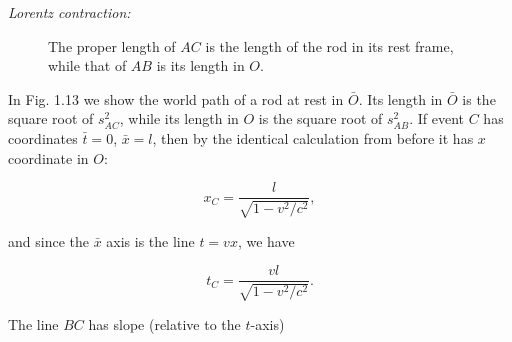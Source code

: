 \documentclass[12pt]{book}
\begin{document}
        \textit{Lorentz contraction:}
        \begin{figure}[h!]
        \centering
        \caption{The proper length of \( AC \) is the length of the rod in its rest frame, while that of \( AB \) is its length in \( O \).}
        \end{figure}

        In Fig. 1.13 we show the world path of a rod at rest in \( \bar{O} \). Its length in \( \bar{O} \) is the square root of \( s^2_{AC} \), while its length in \( O \) is the square root of \( s^2_{AB} \). If event \( C \) has coordinates \( \bar{t} = 0 \), \( \bar{x} = l \), then by the identical calculation from before it has \( x \) coordinate in \( O \):
        
        \[
        x_C = \frac{l}{\sqrt{1 - v^2/c^2}},
        \]
        
        and since the \( \bar{x} \) axis is the line \( t = vx \), we have
        
        \[
        t_C = \frac{vl}{\sqrt{1 - v^2/c^2}}.
        \]
        
        The line \( BC \) has slope (relative to the \( t \)-axis) 
        
\end{document}
